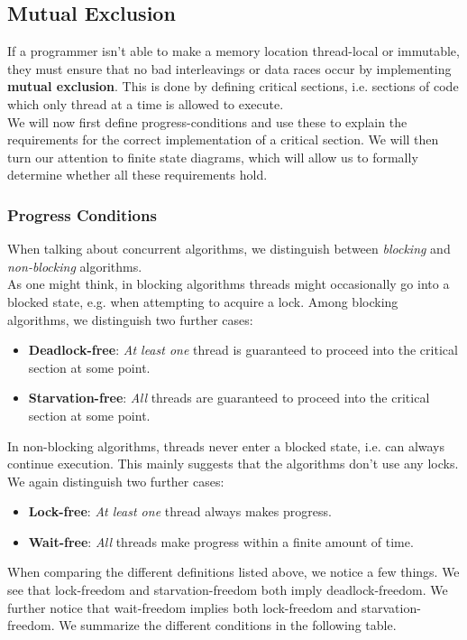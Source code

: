 \documentclass[main]{subfiles}
\begin{document}
\subsection{Mutual Exclusion}
If a programmer isn't able to make a memory location thread-local or immutable, they must ensure that no bad interleavings or data races occur by implementing \textbf{mutual exclusion}. This is done by defining critical sections, i.e. sections of code which only thread at a time is allowed to execute.\\[3mm]
We will now first define progress-conditions and use these to explain the requirements for the correct implementation of a critical section. We will then turn our attention to finite state diagrams, which will allow us to formally determine whether all these requirements hold. 

\subsubsection{Progress Conditions} \label{progress conditions}
When talking about concurrent algorithms, we distinguish between \textit{blocking} and \textit{non-blocking} algorithms.\\[3mm]
As one might think, in blocking algorithms threads might occasionally go into a blocked state, e.g. when attempting to acquire a lock. Among blocking algorithms, we distinguish two further cases:
\begin{itemize}
    \item \textbf{Deadlock-free}: \textit{At least one} thread is guaranteed to proceed into the critical section at some point.
    \item \textbf{Starvation-free}: \textit{All} threads are guaranteed to proceed into the critical section at some point.
\end{itemize} 
In non-blocking algorithms, threads never enter a blocked state, i.e. can always continue execution. This mainly suggests that the algorithms don't use any locks. We again distinguish two further cases:
\begin{itemize}
    \item \textbf{Lock-free}: \textit{At least one} thread always makes progress.
    \item \textbf{Wait-free}: \textit{All} threads make progress within a finite amount of time.
\end{itemize}
When comparing the different definitions listed above, we notice a few things. We see that lock-freedom and starvation-freedom both imply deadlock-freedom. We further notice that wait-freedom implies both lock-freedom and starvation-freedom. We summarize the different conditions in the following table.
\end{document}
